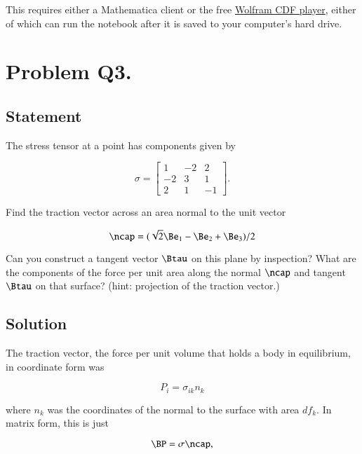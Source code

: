 This requires either a Mathematica client or the free \href{http://www.wolfram.com/cdf-player/}{Wolfram CDF player}, either of which can run the notebook after it is saved to your computer's hard drive.

\section{Problem Q3.}
\subsection{Statement}

The stress tensor at a point has components given by

\begin{equation}\label{eqn:continuumProblemSet1:50}
\sigma =
\begin{bmatrix}
1 & -2 & 2 \\
-2 & 3 & 1 \\
2 & 1 & -1
\end{bmatrix}.
\end{equation}

Find the traction vector across an area normal to the unit vector

\begin{equation}\label{eqn:continuumProblemSet1:70}
\ncap = ( \sqrt{2} \Be_1 - \Be_2 + \Be_3)/2
\end{equation}

Can you construct a tangent vector $\Btau$ on this plane by inspection?  What are the components of the force per unit area along the normal $\ncap$ and tangent $\Btau$ on that surface?  (hint: projection of the traction vector.)

\subsection{Solution}

The traction vector, the force per unit volume that holds a body in equilibrium, in coordinate form was

\begin{equation}\label{eqn:continuumProblemSet1:410}
P_i = \sigma_{ik} n_k
\end{equation}

where $n_k$ was the coordinates of the normal to the surface with area $df_k$.  In matrix form, this is just

\begin{equation}\label{eqn:continuumProblemSet1:430}
\BP = \sigma \ncap,
\end{equation}

